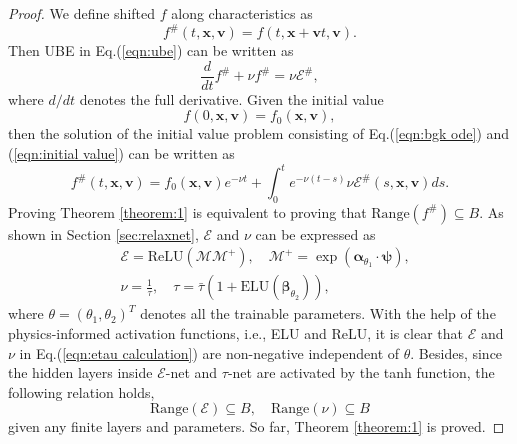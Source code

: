 \documentclass[preprint,3p,12pt,sort&compress]{elsarticle}
\begin{document}
\begin{proof}
We define shifted $f$ along characteristics as
\begin{equation}
    f^{\#}(t,\mathbf x,\mathbf v)=f(t,\mathbf x+\mathbf v t,\mathbf v).
\end{equation}
Then UBE in Eq.(\ref{eqn:ube}) can be written as
\begin{equation}
    \frac{d}{dt} f^{\#} + \nu f^{\#} = \nu \mathcal E^{\#},
    \label{eqn:bgk ode}
\end{equation}
where $d/dt$ denotes the full derivative.
Given the initial value
\begin{equation}
    f(0,\mathbf x,\mathbf v)=f_0(\mathbf x,\mathbf v),
    \label{eqn:initial value}
\end{equation}
then the solution of the initial value problem consisting of Eq.(\ref{eqn:bgk ode}) and (\ref{eqn:initial value}) can be written as \cite{babovsky1998boltzmann}
\begin{equation}
    f^{\#}(t,\mathbf x,\mathbf v) = f_0(\mathbf x,\mathbf v) e^{-\nu t} + \int_0^t e^{-\nu (t-s)} \nu \mathcal E^{\#}(s,\mathbf x,\mathbf v) ds.
\end{equation}
Proving Theorem \ref{theorem:1} is equivalent to proving that $\mathrm{Range}(f^{\#}) \subseteq B$.
As shown in Section \ref{sec:relaxnet}, $\mathcal E$ and $\nu$ can be expressed as
\begin{equation}
\begin{aligned}
    &\mathcal E=\mathrm{ReLU}(\mathcal M \mathcal M^+), \quad \mathcal M^+=\exp (\boldsymbol\alpha_{\theta_1} \cdot \boldsymbol\psi), \\
    &\nu = \frac{1}{\tau}, \quad \tau = \bar\tau (1 + \mathrm{ELU} (\boldsymbol\beta_{\theta_2})),
\end{aligned}
\label{eqn:etau calculation}
\end{equation}
where $\theta=(\theta_1,\theta_2)^T$ denotes all the trainable parameters.
With the help of the physics-informed activation functions, i.e., ELU and ReLU, it is clear that $\mathcal E$ and $\nu$ in Eq.(\ref{eqn:etau calculation}) are non-negative independent of $\theta$.
Besides, since the hidden layers inside $\mathcal E$-net and $\tau$-net are activated by the tanh function, the following relation holds,
\begin{equation}
    \mathrm{Range}(\mathcal E) \subseteq B, \quad \mathrm{Range}(\nu) \subseteq B
\end{equation}
given any finite layers and parameters.
So far, Theorem \ref{theorem:1} is proved.
\end{proof}
\end{document}
